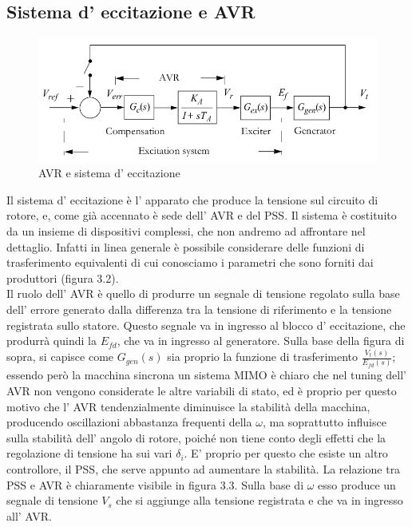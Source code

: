 \documentclass[Lau,noexaminfo]{sapthesis}
\begin{document}
	\subsection{Sistema d' eccitazione e AVR}
	\begin{figure}
		\centering
		\includegraphics[height=0.20\textheight]{AVR}
		\caption{AVR e sistema d' eccitazione}
	\end{figure}
	Il sistema d' eccitazione è l' apparato che produce la tensione sul circuito di rotore, e, come già accennato è sede dell' AVR e del PSS. Il sistema è costituito da un insieme di dispositivi complessi, che non andremo ad affrontare nel dettaglio. Infatti in linea generale è possibile considerare delle funzioni di trasferimento equivalenti di cui conosciamo i parametri che sono forniti dai produttori (figura 3.2).\\
	Il ruolo dell' AVR è quello di produrre un segnale di tensione regolato sulla base dell' errore generato dalla differenza tra la tensione di riferimento e la tensione registrata sullo statore. Questo segnale va in ingresso al blocco d' eccitazione, che produrrà quindi la $E_{fd}$, che va in ingresso al generatore. Sulla base della figura di sopra, si capisce come $G_{gen}(s)$ sia proprio la funzione di trasferimento $\frac{V_t(s)}{E_{fd}(s)}$; essendo però la macchina sincrona un sistema MIMO è chiaro che nel tuning dell' AVR non vengono considerate le altre variabili di stato, ed è proprio per questo motivo che l' AVR tendenzialmente diminuisce la stabilità della macchina, producendo oscillazioni abbastanza frequenti della $\omega$, ma soprattutto influisce sulla stabilità dell' angolo di rotore, poiché non tiene conto degli effetti che la regolazione di tensione ha sui vari $\delta_i$. E' proprio per questo che esiste un altro controllore, il PSS, che serve appunto ad aumentare la stabilità. La relazione tra PSS e AVR è chiaramente visibile in figura 3.3. Sulla base di $\omega$ esso produce un segnale di tensione $V_s$ che si aggiunge alla tensione registrata e che va in ingresso all' AVR.\\
\end{document}
